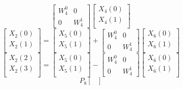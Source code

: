 \documentclass[journal,12pt,twocolumn]{IEEEtran}
\renewcommand\thesection{\arabic{section}}
\begin{document}
\begin{enumerate}[label=\arabic*.,ref=\thesection.\theenumi]
\begin{equation}
\begin{bmatrix}
    W^{0}_{4} & 0\\
    0 & W^{1}_{4}
    \end{bmatrix}
    \begin{bmatrix}
    X_{4}(0) \\ 
    X_{4}(1) \\ 
    \end{bmatrix}
    \label{4to2_2}
    \end{equation}
    \begin{equation}
    \begin{bmatrix}
    X_{2}(0) \\ 
    X_{2}(1)\\ 
    \end{bmatrix}
    =
    \begin{bmatrix}
    X_{5}(0) \\ 
    X_{5}(1)\\ 
    \end{bmatrix}
    +
    \begin{bmatrix}
    W^{0}_{4} & 0\\
    0 & W^{1}_{4}
    \end{bmatrix}
    \begin{bmatrix}
    X_{6}(0) \\ 
    X_{6}(1) \\ 
    \end{bmatrix}
    \label{4to2_3}
    \end{equation}
    \begin{equation}
    \begin{bmatrix}
    X_{2}(2) \\ 
    X_{2}(3)\\ 
    \end{bmatrix}
    =
    \begin{bmatrix}
    X_{5}(0) \\ 
    X_{5}(1)\\ 
    \end{bmatrix}
    -
    \begin{bmatrix}
    W^{0}_{4} & 0\\
    0 & W^{1}_{4}
    \end{bmatrix}
    \begin{bmatrix}
    X_{6}(0) \\ 
    X_{6}(1) \\ 
    \end{bmatrix}
    \label{4to2_4}
    \end{equation}
    \begin{equation}
    P_{8}
    \begin{bmatrix}

\end{bmatrix}
\end{equation}
\end{enumerate}
\end{document}
